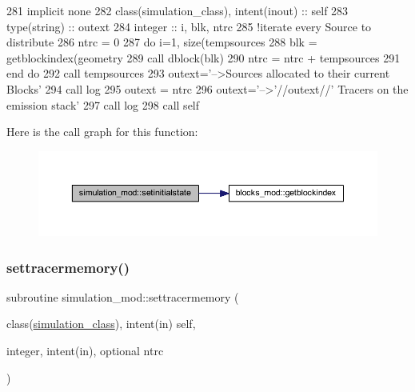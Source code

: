 \begin{DoxyCode}
281     \textcolor{keywordtype}{implicit none}
282     \textcolor{keywordtype}{class}(simulation\_class), \textcolor{keywordtype}{intent(inout)} :: self
283     \textcolor{keywordtype}{type}(string) :: outext
284     \textcolor{keywordtype}{integer} :: i, blk, ntrc
285     \textcolor{comment}{!iterate every Source to distribute}
286     ntrc = 0
287     \textcolor{keywordflow}{do} i=1, \textcolor{keyword}{size}(tempsources%
288         blk = getblockindex(geometry%
289         \textcolor{keyword}{call }dblock(blk)%
290         ntrc = ntrc + tempsources%
291 \textcolor{keywordflow}{    end do}
292     \textcolor{keyword}{call }tempsources%
293     outext=\textcolor{stringliteral}{'-->Sources allocated to their current Blocks'}
294     \textcolor{keyword}{call }log%
295     outext = ntrc
296     outext=\textcolor{stringliteral}{'-->'}//outext//\textcolor{stringliteral}{' Tracers on the emission stack'}
297     \textcolor{keyword}{call }log%
298     \textcolor{keyword}{call }self%
\end{DoxyCode}
Here is the call graph for this function\+:\nopagebreak
\begin{figure}[H]
\begin{center}
\leavevmode
\includegraphics[width=350pt]{namespacesimulation__mod_a447c6d709de6aa360a65d39d660e627b_cgraph}
\end{center}
\end{figure}
\mbox{\label{namespacesimulation__mod_acc5fa823c8dd599de8feda8988c224f2}} 
\subsubsection{\texorpdfstring{settracermemory()}{settracermemory()}}
{\footnotesize\ttfamily subroutine simulation\+\_\+mod\+::settracermemory (\begin{DoxyParamCaption}\item[{class(\mbox{\hyperlink{structsimulation__mod_1_1simulation__class}{simulation\+\_\+class}}), intent(in)}]{self,  }\item[{integer, intent(in), optional}]{ntrc }\end{DoxyParamCaption})\hspace{0.3cm}{\ttfamily [private]}}



